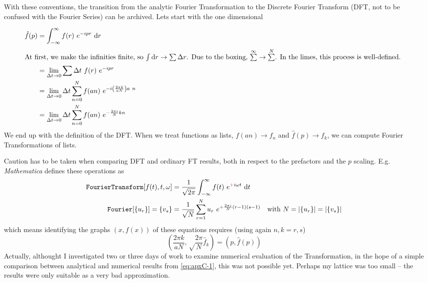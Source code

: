 \documentclass[10pt,a4paper, fleqn]{article}
\begin{document}
\begin{appendices}
With these conventions, the transition from the analytic Fourier Transformation to the Discrete Fourier Transform (DFT, not to be confused with the Fourier Series) can be archived. Lets start with the one dimensional

\begin{subequations}
\begin{align}
\hat f(p) &= \int_{-\infty}^{\infty} f(r)~e^{-i p r}~\mathrm{d} r \\
\intertext{At first, we make the infinities finite, so $\int \mathrm{d} r \to \sum \Delta r$. Due to the boxing, $\sum\limits^{\infty} \to \sum\limits^N$. In the limes, this process is well-defined.
}
&= \lim_{\Delta t \to 0} \sum \Delta t ~ f(r)~e^{-ipr} \\
&= \lim_{\Delta t \to 0} \Delta t \sum_{n=0}^N f(an)~ e^{-i \left( \frac{2\pi k}{aN}\right) a~n} \\
&= \lim_{\Delta t \to 0} \Delta t \sum_{n=0}^N f(an)~ e^{-\frac{2\pi i}N kn}
\end{align}
\end{subequations}
%
We end up with the definition of the DFT. When we treat functions as lists, $f(an)\to f_n$ and $\hat f(p)\to f_k$, we can compute Fourier Transformations of lists.

Caution has to be taken when comparing DFT and ordinary FT results, both in respect to the prefactors and the $p$ scaling. E.g. {\it Mathematica} defines these operations as
\begin{subequations}
\begin{align}
{\tt FourierTransform[}f(t),t,\omega{\tt ]} &= \frac{1}{\sqrt{2\pi}} \int_{-\infty}^\infty f(t)~e^{\redplus i\omega t}~\d t \\
{\tt Fourier[}\{u_r\}{\tt ]} = \{ v_s \} &= \frac{1}{\sqrt N} \sum_{r=1}^N u_r~e^{\redplus \frac{2\pi i}N (r-1)(s-1)}
\quad\text{with }N=|\{ u_r\}|=|\{v_s\}|
\end{align}
\end{subequations}
%
which means identifying the graphs $(x,f(x))$ of these equations requires (using again $n,k=r,s$)
%
\begin{equation}
\left(\frac{2\pi k}{a N}, \sqrt\frac{2\pi}N \hat f_k \right) = (p, \hat f(p))
\label{eq:apxC-1}
\end{equation}
%
Actually, althought I investigated two or three days of work to examine numerical evaluation of the Transformation, in the hope of a simple comparison between analytical and numerical results from \eqref{eq:apxC-1}, this was not possible yet. Perhaps my lattice was too small -- the results were only suitable as a very bad approximation.

\end{appendices}
\end{document}
